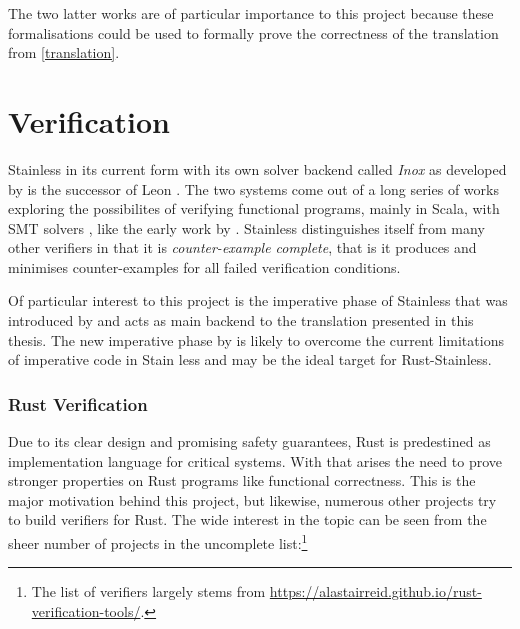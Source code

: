 The two latter works are of particular importance to this project because these
formalisations could be used to formally prove the correctness of the
translation from \autoref{translation}.

\section{Verification}

Stainless in its current form with its own solver backend called \emph{Inox}
\cite{nicolas} as developed by \citet*{stainless} is the successor of Leon
\cite{leon}. The two systems come out of a long series of works exploring the
possibilites of verifying functional programs, mainly in Scala, with SMT solvers
\cite{smt}, like the early work by \citet{smrp}. Stainless distinguishes itself
from many other verifiers in that it is \emph{counter-example complete}, that is
it produces and minimises counter-examples for all failed verification
conditions.

Of particular interest to this project is the imperative phase of Stainless that
was introduced by \citet{regb} and acts as main backend to the translation
presented in this thesis. The new imperative phase by \citet{new-imperative} is
likely to overcome the current limitations of imperative code in Stain less and
may be the ideal target for Rust-Stainless.

\subsubsection{Rust Verification}

Due to its clear design and promising safety guarantees, Rust is predestined as
implementation language for critical systems. With that arises the need to prove
stronger properties on Rust programs like functional correctness. This is the
major motivation behind this project, but likewise, numerous other projects try
to build verifiers for Rust. The wide interest in the topic can be seen from the
sheer number of projects in the uncomplete list:\footnote{The list of verifiers
largely stems from
\url{https://alastairreid.github.io/rust-verification-tools/}.}

